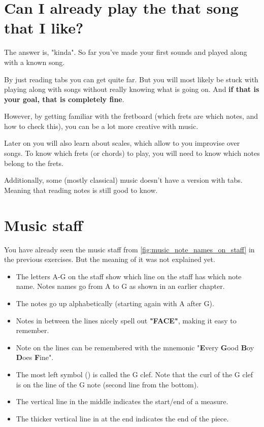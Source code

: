 \section{Can I already play the that song that I like?}

The answer is, "kinda". So far you've made your first sounds and played along with a known song.

By just reading tabs you can get quite far. But you will most likely be stuck with playing along with songs without really knowing what is going on. And \textbf{if that is your goal, that is completely fine}.

However, by getting familiar with the fretboard (which frets are which notes, and how to check this), you can be a lot more creative with music.

Later on you will also learn about scales, which allow to you improvise over songs. To know which frets (or chords) to play, you will need to know which notes belong to the frets.

Additionally, some (mostly classical) music doesn't have a version with tabs. Meaning that reading notes is still good to know.

\section{Music staff}

You have already seen the music staff from \autoref{fig:music_note_names_on_staff} in the previous exercises. But the meaning of it was not explained yet.

\begin{itemize}
	\item The letters A-G on the staff show which line on the staff has which note name. Notes names go from A to G as shown in an earlier chapter.
	\item The notes go up alphabetically (starting again with A after G). 
	\item Notes in between the lines nicely spell out \textbf{"FACE"}, making it easy to remember.
	\item Note on the lines can be remembered with the mnemonic "\textbf{E}very \textbf{G}ood \textbf{B}oy \textbf{D}oes \textbf{F}ine".
	\item The most left symbol (\clefG) is called the G clef. Note that the curl of the G clef is on the line of the G note (second line from the bottom). 
	\item The vertical line in the middle indicates the start/end of a measure.
	\item The thicker vertical line in at the end indicates the end of the piece.
\end{itemize}

